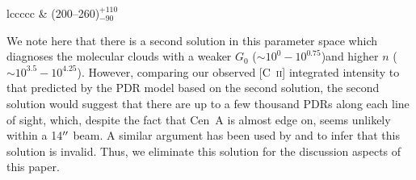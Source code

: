\begin{deluxetable}{lccccc}
 	& (200--260)$^{+110}_{-90}$ \\
 \enddata
\end{deluxetable}

We note here that there is a second solution in this parameter space which diagnoses the molecular clouds with a weaker $G_{0}$ ($\sim 10^{0}-10^{0.75}$)and higher $n$ ($\sim 10^{3.5}-10^{4.25}$).  However, comparing our observed [C~\textsc{ii}] integrated intensity to that predicted by the PDR model based on the second solution, the second solution would suggest that there are up to a few thousand PDRs along each line of sight, which, despite the fact that Cen~A is almost edge on, seems unlikely within a 14$\mbox{$^{\prime\prime}$}$ beam.  A similar argument has been used by \citet{2005A&A...441..961K} and \citet{parkin_2013} to infer that this solution is invalid.  Thus, we eliminate this solution for the discussion aspects of this paper.


